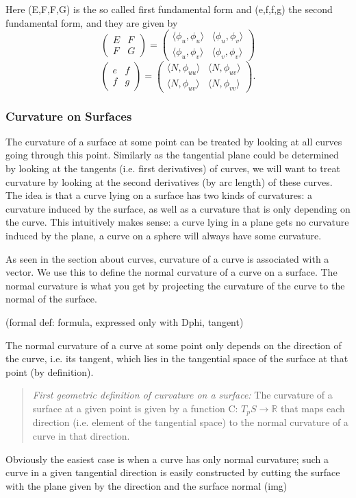 Here (E,F,F,G) is the so called first fundamental form and (e,f,f,g) the second fundamental form, and they are given by
\[\begin{pmatrix} E & F \\ F & G \end{pmatrix} = \begin{pmatrix} \langle \phi_u, \phi_u \rangle & \langle \phi_u, \phi_v \rangle \\ 
							\langle \phi_u, \phi_v \rangle & \langle \phi_v, \phi_v \rangle \end{pmatrix}\]
\[\begin{pmatrix} e & f \\ f & g \end{pmatrix} = \begin{pmatrix} \langle N, \phi_{uu} \rangle & \langle N, \phi_{uv} \rangle \\ 
							\langle N, \phi_{uv} \rangle & \langle N, \phi_{vv} \rangle \end{pmatrix}.\]


\subsubsection{Curvature on Surfaces}

The curvature of a surface at some point can be treated by looking at all curves going through this point. Similarly as the tangential plane could be determined by looking at the tangents (i.e. first derivatives) of curves, we will want to treat curvature by looking at the second derivatives (by arc length) of these curves. The idea is that a curve lying on a surface has two kinds of curvatures: a curvature induced by the surface, as well as a curvature that is only depending on the curve. This intuitively makes sense: a curve lying in a plane gets no curvature induced by the plane, a curve on a sphere will always have some curvature.

As seen in the section about curves, curvature of a curve is associated with a vector. We use this to define the normal curvature of a curve on a surface. The normal curvature is what you get by projecting  the curvature of the curve to the normal of the surface.

(formal def: formula, expressed only with Dphi, tangent)

The normal curvature of a curve at some point only depends on the direction of the curve, i.e. its tangent, which lies in the tangential space of the surface at that point (by definition).
\begin{quote}
\emph{First geometric definition of curvature on a surface:} The curvature of a surface at a given point is given by a function C: $T_p S \rightarrow \mathbb R$ that maps each direction (i.e. element of the tangential space) to the normal curvature of a curve in that direction.
\end{quote}
 Obviously the easiest case is when a curve has only normal curvature; such a curve in a given tangential direction is easily constructed by cutting the surface with the plane given by the direction and the surface normal (img)

